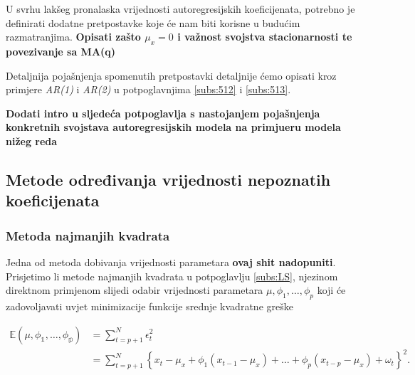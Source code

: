 \documentclass[a4paper,12pt,oneside]{memoir}
\begin{document}
            U svrhu lakšeg pronalaska vrijednosti autoregresijskih koeficijenata, potrebno je definirati dodatne pretpostavke koje će nam biti korisne u budućim razmatranjima. \textbf{Opisati zašto $\mu_x=0$ i važnost svojstva stacionarnosti te povezivanje sa MA(q)}
            
            
            Detaljnija pojašnjenja spomenutih pretpostavki detaljnije ćemo opisati kroz primjere \textit{AR(1)} i \textit{AR(2)} u potpoglavnjima \ref{subs:512} i \ref{subs:513}.
            
            
            


            \textbf{Dodati intro u sljedeća potpoglavlja s nastojanjem pojašnjenja konkretnih svojstava autoregresijskih modela na primjueru modela nižeg reda}

            \subsection{Metode određivanja vrijednosti nepoznatih koeficijenata}


            \subsubsection{Metoda najmanjih kvadrata}

            Jedna od metoda dobivanja vrijednosti parametara \textbf{ovaj shit nadopuniti}. Prisjetimo li metode najmanjih kvadrata u potpoglavlju \ref{subs:LS}, njezinom direktnom primjenom slijedi odabir vrijednosti parametara $\mu,\phi_1,\ldots,\phi_p$ koji će zadovoljavati uvjet minimizacije funkcije srednje kvadratne greške
            
            \begin{equation}
                \begin{split}
                    \mathbb{E(\mu,\phi_1,\ldots,\phi_p)}&=\displaystyle\sum_{t=p+1}^N\epsilon_t^2\\
                    & =\displaystyle\sum_{t=p+1}^N\left\{x_t-\mu_x+\phi_1\left(x_{t-1}-\mu_x\right)+\ldots+\phi_p\left(x_{t-p}-\mu_x\right)+\omega_t\right\}^2.
                \end{split}
                \label{eq:56}
            \end{equation}
\end{document}
